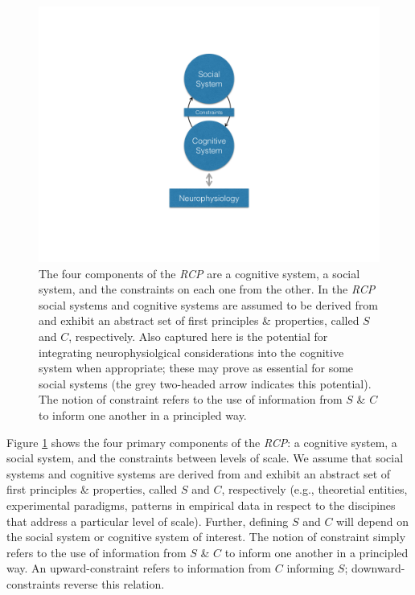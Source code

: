 \documentclass{article}
\begin{document}
\begin{figure}
	\centering
	\includegraphics[width=1.0\textwidth]{RCP_diagram.png}
	\caption{\label{fig:rcpdiagram} The four components of the \textit{RCP} are a cognitive system, a social system, and the constraints on each one from the other.  In the \textit{RCP} social systems and cognitive systems are assumed to be derived from and exhibit an abstract set of first principles \& properties, called $S$ and $C$, respectively.  Also captured here is the potential for integrating neurophysiolgical considerations into the cognitive system when appropriate; these may prove as essential for some social systems (the grey two-headed arrow indicates this potential). The notion of constraint refers to the use of information from $S$ \& $C$ to inform one another in a principled way.  
	}
\end{figure}

Figure \ref{fig:rcpdiagram} shows the four primary components of the \textit{RCP}: a cognitive system, a social system, and the constraints between levels of scale.  We assume that social systems and cognitive systems are derived from and exhibit an abstract set of first principles \& properties, called $S$ and $C$, respectively (e.g., theoretial entities, experimental paradigms, patterns in empirical data in respect to the discipines that address a particular level of scale).  Further, defining $S$ and $C$ will depend on the social system or cognitive system of interest.  The notion of constraint simply refers to the use of information from $S$ \& $C$ to inform one another in a principled way. An upward-constraint refers to information from $C$ informing $S$; downward-constraints reverse this relation.
\end{document}
